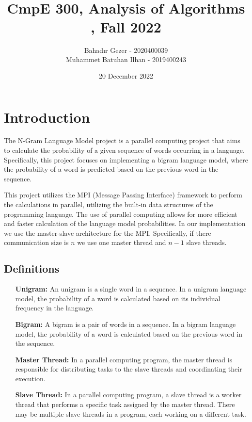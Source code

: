 \documentclass[12pt, A4, titlepage]{article}
\title{\vspace{-2cm} \HHUGE{Project 2} \\ \vspace{1cm} \TitleFont{MPI Programming on Bigram Language Model} \\ \vspace{0.7cm} \LARGE CmpE 300, Analysis of Algorithms , Fall 2022 \vspace{6cm}}
\author{
    Bahadır Gezer - 2020400039 \\
    Muhammet Batuhan Ilhan - 2019400243 \\
}
\date{20 December 2022}
\begin{document}
\maketitle

\newpage
\tableofcontents

\newpage
\section{Introduction}

The N-Gram Language Model project is a parallel computing project that aims to calculate the probability of a given sequence of words occurring in a language. Specifically, this project focuses on implementing a bigram language model, where the probability of a word is predicted based on the previous word in the sequence.

This project utilizes the MPI (Message Passing Interface) framework to perform the calculations in parallel, utilizing the built-in data structures of the programming language. The use of parallel computing allows for more efficient and faster calculation of the language model probabilities. In our implementation we use the master-slave architecture for the MPI. Specifically, if there communication size is $n$ we use one master thread and $n-1$ slave threads. 

\subsection{Definitions}

\begin{itemize}
    \item[\textbf{Unigram:}] An unigram is a single word in a sequence. In a unigram language model, the probability of a word is calculated based on its individual frequency in the language.
    \item[\textbf{Bigram:}] A bigram is a pair of words in a sequence. In a bigram language model, the probability of a word is calculated based on the previous word in the sequence.
    \item[\textbf{Master Thread:}] In a parallel computing program, the master thread is responsible for distributing tasks to the slave threads and coordinating their execution.
    \item[\textbf{Slave Thread:}] In a parallel computing program, a slave thread is a worker thread that performs a specific task assigned by the master thread. There may be multiple slave threads in a program, each working on a different task.    
\end{itemize}
\end{document}
